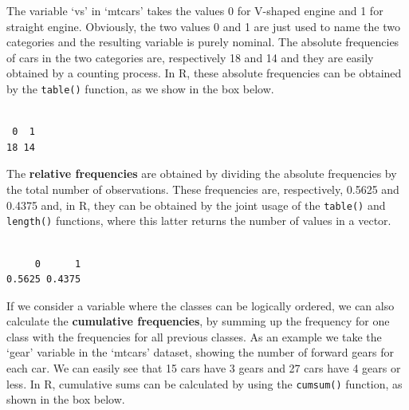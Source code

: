 \documentclass[
  letterpaper,
  DIV=11,
  numbers=noendperiod]{scrreprt}
\newenvironment{Shaded}{\begin{snugshade}}{\end{snugshade}}
\newcommand{\FunctionTok}[1]{\textcolor[rgb]{0.28,0.35,0.67}{#1}}
\newcommand{\NormalTok}[1]{\textcolor[rgb]{0.00,0.23,0.31}{#1}}
\newcommand{\SpecialCharTok}[1]{\textcolor[rgb]{0.37,0.37,0.37}{#1}}
\begin{document}
The variable `vs' in `mtcars' takes the values 0 for V-shaped engine and
1 for straight engine. Obviously, the two values 0 and 1 are just used
to name the two categories and the resulting variable is purely nominal.
The absolute frequencies of cars in the two categories are, respectively
18 and 14 and they are easily obtained by a counting process. In R,
these absolute frequencies can be obtained by the \texttt{table()}
function, as we show in the box below.

\begin{Shaded}
\end{Shaded}

\begin{verbatim}

 0  1 
18 14 
\end{verbatim}

The \textbf{relative frequencies} are obtained by dividing the absolute
frequencies by the total number of observations. These frequencies are,
respectively, 0.5625 and 0.4375 and, in R, they can be obtained by the
joint usage of the \texttt{table()} and \texttt{length()} functions,
where this latter returns the number of values in a vector.

\begin{Shaded}
\end{Shaded}

\begin{verbatim}

     0      1 
0.5625 0.4375 
\end{verbatim}

If we consider a variable where the classes can be logically ordered, we
can also calculate the \textbf{cumulative frequencies}, by summing up
the frequency for one class with the frequencies for all previous
classes. As an example we take the `gear' variable in the `mtcars'
dataset, showing the number of forward gears for each car. We can easily
see that 15 cars have 3 gears and 27 cars have 4 gears or less. In R,
cumulative sums can be calculated by using the \texttt{cumsum()}
function, as shown in the box below.
\end{document}

